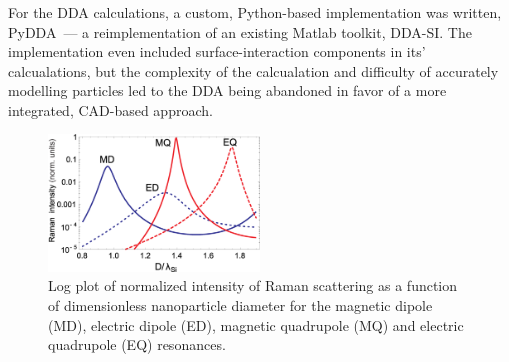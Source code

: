         \subsubsection{}
        \label{subsec:DDA}

                For the DDA calculations, a custom, Python-based implementation was written, PyDDA~--- a reimplementation of an existing
            Matlab toolkit, DDA-SI\cite{loke2011discrete}. The implementation even included surface-interaction components in its' calcualations,
            but the complexity of the calcualation and difficulty of accurately modelling particles led to the DDA being abandoned in favor of a more
            integrated, CAD-based approach.

            \begin{figure}[h!]
                \begin{center}
                    \includegraphics[width=0.5\textwidth]{figs/intro/TheoryEnhancement.eps}
                \end{center}
                \caption{Log plot of normalized intensity of Raman scattering as a function of dimensionless nanoparticle diameter for the magnetic dipole (MD),
                electric dipole (ED), magnetic quadrupole (MQ) and electric quadrupole (EQ) resonances.}
                \label{fig:TheoryEnhancement}
            \end{figure}

        \subsubsection{}
        \label{subsec:FIT}

\clearpage
